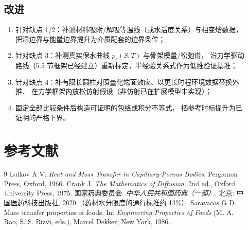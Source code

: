 \documentclass[12pt,a4paper]{ctexart}
\numberwithin{equation}{section}
\begin{document}
\subsection{改进}
\begin{enumerate}
  \item 针对缺点 1/2：补测材料吸附/解吸等温线（或水活度关系）与相变焓数据，
        把湿边界与能量边界提升为介质配套的边界条件；
  \item 针对缺点 3：补测真实保水曲线 $p_c(S,T)$ 与骨架模量/松弛谱，
        沿力学驱动路线（5.5 节框架已经建立）重新标定，半经验关系式作为低维验证基准；
  \item 针对缺点 4：补有限长圆柱对照量化端面效应、以更长时程环境数据替换外推、
        在力学框架内放松仿射假设（非仿射已在扩展模型中实现）；
  \item 固定全部比较条件后构造可证明的包络或积分不等式，
        把参考时标提升为已证明的严格下界。
\end{enumerate}

\section*{参考文献}
\begingroup
\renewcommand{\section}[2]{}%
\begin{thebibliography}{9}
 Luikov A V. \emph{Heat and Mass Transfer in Capillary-Porous Bodies}.
Pergamon Press, Oxford, 1966.
 Crank J. \emph{The Mathematics of Diffusion}. 2nd ed.,
Oxford University Press, 1975.
 国家药典委员会. \emph{中华人民共和国药典（一部）}.
北京: 中国医药科技出版社, 2020.（药材水分限度的通行标准约 13\%）
 Saravacos G D. Mass transfer properties of foods. In:
\emph{Engineering Properties of Foods} (M. A. Rao, S. S. Rizvi, eds.),
Marcel Dekker, New York, 1986.
\end{thebibliography}
\endgroup

\appendix
{}
\end{document}
